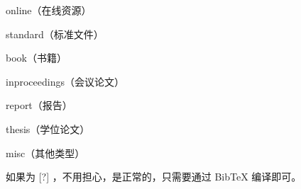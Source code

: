 \documentclass[oneside]{cdut_thesis} %
\begin{document}
online（在线资源）\cite{online_example}

standard（标准文件）\cite{standard_example}

book（书籍）\cite{book_example}

inproceedings（会议论文）\cite{inproceedings_example}

report（报告）\cite{report_example}

thesis（学位论文）\cite{thesis_example}

misc（其他类型）\cite{misc_example}

如果为 [?] ，不用担心，是正常的，只需要通过 BibTeX  编译即可。




\null\par



\end{document}
